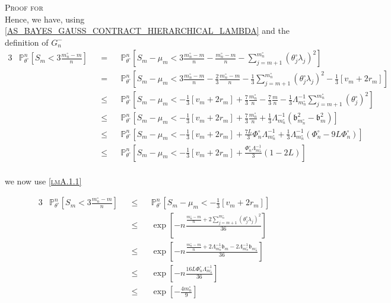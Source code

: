 \begin{pro}{\textsc{Proof for } \\}
Hence, we have,  using \textsc{\cref{AS_BAYES_GAUSS_CONTRACT_HIERARCHICAL_LAMBDA}} and the definition of $G_{n}^{-}$
\begin{alignat*}{3}
&\mathds{P}_{\theta^{\circ}}^{n}\left[S_{m} < 3 \frac{m_{n}^{\circ} - m}{n}\right] &&=&& \mathds{P}_{\theta^{\circ}}^{n}\left[S_{m} - \mu_{m} < 3 \frac{m_{n}^{\circ} - m}{n} - \frac{m_{n}^{\circ} - m}{n} - \sum\limits_{j = m+1}^{m_{n}^{\circ}}\left(\theta^{\circ}_{j}\lambda_{j}\right)^{2}\right]\\
& && = &&\mathds{P}_{\theta^{\circ}}^{n}\left[S_{m} - \mu_{m} < 3 \frac{m_{n}^{\circ} - m}{n} - \frac{2}{3}\frac{m_{n}^{\circ} - m}{n} - \frac{1}{3}\sum\limits_{j = m+1}^{m_{n}^{\circ}}\left(\theta^{\circ}_{j}\lambda_{j}\right)^{2} - \frac{1}{3} \left[v_{m} + 2 r_{m}\right]\right]\\
& &&\leq&& \mathds{P}_{\theta^{\circ}}^{n}\left[S_{m} - \mu_{m} <  - \frac{1}{3} \left[v_{m} + 2 r_{m}\right] + \frac{7}{3} \frac{m_{n}^{\circ}}{n} - \frac{7}{3} \frac{m}{n} - \frac{1}{3} \Lambda_{m_{n}^{\circ}}^{-1}\sum\limits_{j = m+1}^{m_{n}^{\circ}}\left(\theta^{\circ}_{j}\right)^{2}\right]\\
& &&\leq&& \mathds{P}_{\theta^{\circ}}^{n}\left[S_{m} - \mu_{m} <  - \frac{1}{3} \left[v_{m} + 2 r_{m}\right] + \frac{7}{3} \frac{m_{n}^{\circ}}{n} + \frac{1}{3} \Lambda_{m_{n}^{\circ}}^{-1} \left(\mathfrak{b}_{m_{n}^{\circ}}^{2} - \mathfrak{b}_{m}^{2}\right)\right]\\
& &&\leq&& \mathds{P}_{\theta^{\circ}}^{n}\left[S_{m} - \mu_{m} < - \frac{1}{3} \left[v_{m} + 2 r_{m}\right] + \frac{7 L}{3} \Phi_{n}^{\circ} \Lambda_{m_{n}^{\circ}}^{-1} + \frac{1}{3}\Lambda_{m_{n}^{\circ}}^{-1} \left(\Phi_{n}^{\circ} - 9 L \Phi_{n}^{\circ}\right)\right]\\
& &&\leq&& \mathds{P}_{\theta^{\circ}}^{n}\left[S_{m} - \mu_{m} < - \frac{1}{3} \left[v_{m} + 2 r_{m}\right] + \frac{\Phi_{n}^{\circ} \Lambda_{m_{n}^{\circ}}^{-1}}{3}\left(1 - 2L\right)\right]\\
\end{alignat*}

we now use \textsc{\cref{lmA.1.1}}

\begin{alignat*}{3}
&\mathds{P}_{\theta^{\circ}}^{n}\left[S_{m} < 3 \frac{m_{n}^{\circ} - m}{n}\right] && \leq && \mathds{P}_{\theta^{\circ}}^{n}\left[S_{m} - \mu_{m} < - \frac{1}{3} \left[v_{m} + 2 r_{m}\right]\right]\\
& &&\leq&& \exp\left[- n\frac{\frac{m_{n}^{\circ} - m}{n} + 2 \sum\limits_{j = m + 1}^{m_{n}^{\circ}}\left(\theta^{\circ}_{j}\lambda_{j}\right)^{2}}{36}\right]\\
& &&\leq&& \exp\left[- n\frac{\frac{m_{n}^{\circ} - m}{n} + 2 \Lambda_{m_{n}^{\circ}}^{-1} \mathfrak{b}_{m} - 2 \Lambda_{m_{n}^{\circ}}^{-1} \mathfrak{b}_{m_{n}^{\circ}}}{36}\right]\\
& &&\leq&& \exp\left[- n \frac{16 L \Phi_{n}^{\circ} \Lambda_{m_{n}^{\circ}}^{-1}}{36}\right]\\
& &&\leq&& \exp \left[ - \frac{4 m_{n}^{\circ}}{9} \right]
\end{alignat*}


\end{pro}
